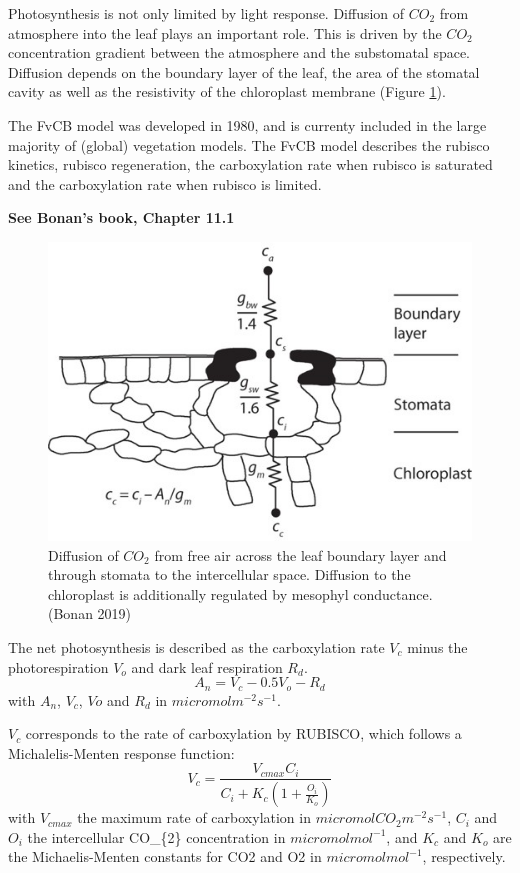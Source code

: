 \documentclass[
  12pt,
  oneside]{book}
\begin{document}
Photosynthesis is not only limited by light response.
Diffusion of \(CO_2\) from atmosphere into the leaf plays an important role. This is driven by the \(CO_2\) concentration gradient between the atmosphere and the substomatal space. Diffusion depends on the boundary layer of the leaf, the area of the stomatal cavity as well as the resistivity of the chloroplast membrane (Figure \ref{fig:f27}).

The FvCB model was developed in 1980, and is currenty included in the large majority of (global) vegetation models. The FvCB model describes the rubisco kinetics, rubisco regeneration, the carboxylation rate when rubisco is saturated and the carboxylation rate when rubisco is limited.

\textbf{See Bonan's book, Chapter 11.1}

\begin{figure}

{\centering \includegraphics[width=0.8\linewidth]{figures/chap2/conductance} 

}

\caption{Diffusion of $CO_2$ from free air across the leaf boundary layer and through stomata to the intercellular space. Diffusion to the chloroplast is additionally regulated by mesophyl conductance. (Bonan 2019)}\label{fig:f27}
\end{figure}

The net photosynthesis is described as the carboxylation rate \(V_c\) minus the photorespiration \(V_o\) and dark leaf respiration \(R_d\).
\[
A_n=V_c-0.5V_o-R_d
\]
with \({A_n}\), \({V_c}\), \({Vo}\) and \({R_d}\) in \(micromol m^{-2} s^{-1}\).

\({V_c}\) corresponds to the rate of carboxylation by RUBISCO, which follows a Michalelis-Menten response function:
\[
V_c=\frac{V_{cmax}C_i}{C_i+K_c\left( 1+\frac{O_i}{K_o}\right)}
\]
with \(V_{cmax}\) the maximum rate of carboxylation in \(micromol CO_{2} m^{-2} s^{-1}\), \(C_i\) and \(O_i\) the intercellular CO\_\{2\} concentration in \(micromol mol^{-1}\), and \(K_c\) and \(K_o\) are the Michaelis-Menten constants for CO2 and O2 in \(micromol mol^{-1}\), respectively.
\end{document}
